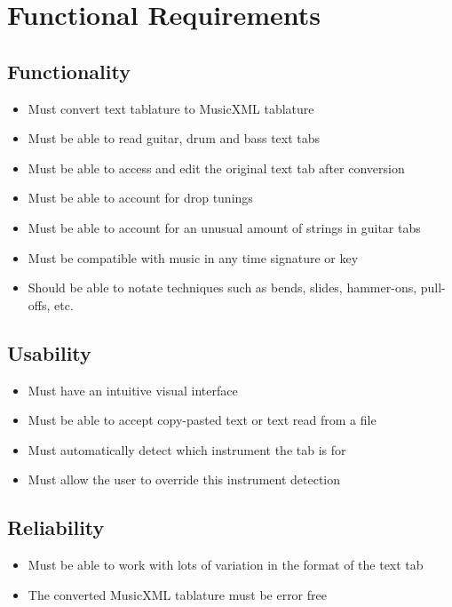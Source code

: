 \documentclass[11pt]{article}
\date{\today}
\title{}
\begin{document}
\tableofcontents

\newpage
\section{Functional Requirements}
\label{sec:orgcbe076f}
\subsection{Functionality}
\label{sec:org3bddf5b}
\begin{itemize}
\item Must convert text tablature to MusicXML tablature
\item Must be able to read guitar, drum and bass text tabs
\item Must be able to access and edit the original text tab after conversion
\item Must be able to account for drop tunings
\item Must be able to account for an unusual amount of strings in guitar tabs
\item Must be compatible with music in any time signature or key
\item Should be able to notate techniques such as bends, slides, hammer-ons, pull-offs, etc.
\end{itemize}

\subsection{Usability}
\label{sec:org169747e}
\begin{itemize}
\item Must have an intuitive visual interface
\item Must be able to accept copy-pasted text or text read from a file
\item Must automatically detect which instrument the tab is for
\item Must allow the user to override this instrument detection
\end{itemize}

\subsection{Reliability}
\label{sec:org3591a37}
\begin{itemize}
\item Must be able to work with lots of variation in the format of the text tab
\item The converted MusicXML tablature must be error free
\end{itemize}
\end{document}
